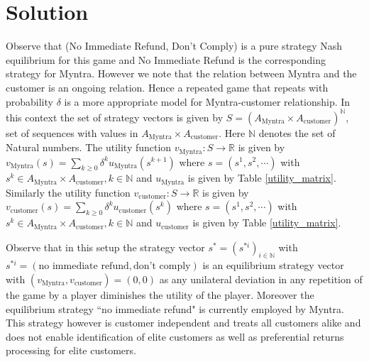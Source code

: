  \section{Solution}
 Observe that (No Immediate Refund, Don't Comply) is a pure strategy Nash equilibrium for this game and No Immediate Refund is the corresponding strategy for Myntra. However we note that the relation between Myntra and the customer is an ongoing relation. Hence a repeated game that repeats with probability $\delta$ is a more appropriate model for Myntra-customer relationship.
 In this context the set of strategy vectors is given by $S= (A_{\text{Myntra}} \times A_{\text{customer}})^{\mathbb{N}}$, set of sequences with values in $A_{\text{Myntra}} \times A_{\text{customer}}.$ Here $\mathbb{N}$ denotes the set of Natural numbers. The utility function $v_{\text{Myntra}}:S\rightarrow \mathbb{R}$ is given by 
 $v_{\text{Myntra}}(s)=\sum_{k\geq0}\delta^{k} u_{\text{Myntra}}(s^{k+1})$ where $s=(s^{1},s^{2},\cdots)$ with $s^{k} \in A_{\text{Myntra}} \times A_{\text{customer}}, k \in \mathbb{N}$ and $u_{\text{Myntra}}$ is given by Table \ref{utility_matrix}. Similarly the utility function 
 $v_{\text{customer}}:S\rightarrow \mathbb{R}$ is given by 
 $v_{\text{customer}}(s)=\sum_{k\geq0}\delta^{k} u_{\text{customer}}(s^{k})$ where $s=(s^{1},s^{2},\cdots)$ with $s^{k} \in A_{\text{Myntra}} \times A_{\text{customer}}, k \in \mathbb{N}$ and $u_{\text{customer}}$ is given by Table \ref{utility_matrix}.
 
 Observe that in this setup the strategy vector $s^{*}=(s^{*i})_{i\in \mathbb{N}}$ with $s^{*i}=(\text{no immediate refund},\text{don't comply})$ is an equilibrium strategy vector with $(v_{\text{Myntra}},v_{\text{customer}})=(0,0)$ as any unilateral deviation in any repetition of the game by a player diminishes the utility of the player. Moreover the equilibrium strategy ``no immediate refund" is currently employed by Myntra.
 This strategy however is customer independent and treats all customers alike and does not enable identification of elite customers as well as preferential returns processing for elite customers.

